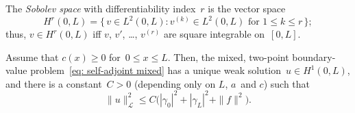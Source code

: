 The \emph{Sobolev space} with differentiability index~$r$ is the vector
space
\begin{equation}\label{eq: Hr 1d def}
H^r(0,L)=\{\,v\in L^2(0,L): \text{$v^{(k)}\in L^2(0,L)$ for $1\le k\le r$}\,\};
\end{equation}
thus, $v\in H^r(0,L)$ iff $v$, $v'$, \dots, $v^{(r)}$ are square integrable
on~$[0,L]$.

\begin{theorem}\label{thm: ||u||A}
Assume that $c(x)\ge0$ for~$0\le x\le L$.  Then, the mixed, two-point 
boundary-value problem~\eqref{eq: self-adjoint mixed} has a unique weak
solution~$u\in H^1(0,L)$, and there is a constant~$C>0$ (depending only on $L$,
$a$~and $c$) such that
\[
\|u\|_{\mathcal{L}}^2\le C\bigl(|\gamma_0|^2+|\gamma_L|^2+\|f\|^2\bigr).
\]
\end{theorem}
